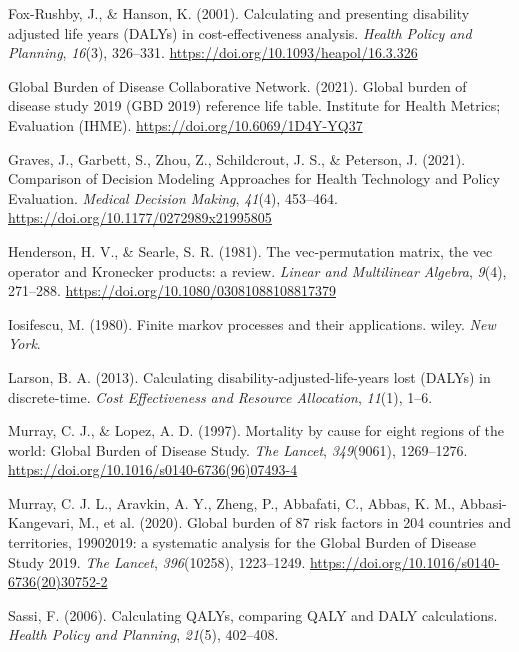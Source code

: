 \documentclass[
]{agujournal2019}
\newlength{\cslhangindent}
\newenvironment{CSLReferences}[2] %
 {\begin{list}{}{%
  \setlength{\itemindent}{0pt}
  \setlength{\leftmargin}{0pt}
  \setlength{\parsep}{0pt}
  \ifodd #1
   \setlength{\leftmargin}{\cslhangindent}
   \setlength{\itemindent}{-1\cslhangindent}
  \fi
  \setlength{\itemsep}{#2\baselineskip}}}
 {\end{list}}
\begin{document}
\begin{CSLReferences}{1}{0}
Fox-Rushby, J., \& Hanson, K. (2001). Calculating and presenting
disability adjusted life years (DALYs) in cost-effectiveness analysis.
\emph{Health Policy and Planning}, \emph{16}(3), 326--331.
\url{https://doi.org/10.1093/heapol/16.3.326}

Global Burden of Disease Collaborative Network. (2021). Global burden of
disease study 2019 (GBD 2019) reference life table. Institute for Health
Metrics; Evaluation (IHME). \url{https://doi.org/10.6069/1D4Y-YQ37}

Graves, J., Garbett, S., Zhou, Z., Schildcrout, J. S., \& Peterson, J.
(2021). Comparison of Decision Modeling Approaches for Health Technology
and Policy Evaluation. \emph{Medical Decision Making}, \emph{41}(4),
453--464. \url{https://doi.org/10.1177/0272989x21995805}

Henderson, H. V., \& Searle, S. R. (1981). The vec-permutation matrix,
the vec operator and Kronecker products: a review. \emph{Linear and
Multilinear Algebra}, \emph{9}(4), 271--288.
\url{https://doi.org/10.1080/03081088108817379}

Iosifescu, M. (1980). Finite markov processes and their applications.
wiley. \emph{New York}.

Larson, B. A. (2013). Calculating disability-adjusted-life-years lost
(DALYs) in discrete-time. \emph{Cost Effectiveness and Resource
Allocation}, \emph{11}(1), 1--6.

Murray, C. J., \& Lopez, A. D. (1997). Mortality by cause for eight
regions of the world: Global Burden of Disease Study. \emph{The Lancet},
\emph{349}(9061), 1269--1276.
\url{https://doi.org/10.1016/s0140-6736(96)07493-4}

Murray, C. J. L., Aravkin, A. Y., Zheng, P., Abbafati, C., Abbas, K. M.,
Abbasi-Kangevari, M., et al. (2020). Global burden of 87 risk factors in
204 countries and territories, 1990{\textendash}2019: a systematic
analysis for the Global Burden of Disease Study 2019. \emph{The Lancet},
\emph{396}(10258), 1223--1249.
\url{https://doi.org/10.1016/s0140-6736(20)30752-2}

Sassi, F. (2006). Calculating QALYs, comparing QALY and DALY
calculations. \emph{Health Policy and Planning}, \emph{21}(5), 402--408.


\end{CSLReferences}
\end{document}
